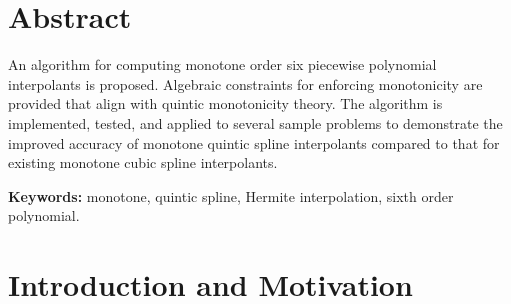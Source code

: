 \documentclass{scspaperproc}
\theoremstyle{scsthe}
\begin{document}
\maketitle



\section*{Abstract}

An algorithm for computing monotone order six piecewise polynomial
interpolants is proposed. Algebraic constraints for enforcing
monotonicity are provided that align with quintic monotonicity
theory. The algorithm is implemented, tested, and applied to several
sample problems to demonstrate the improved accuracy of monotone
quintic spline interpolants compared to that for existing monotone cubic spline
interpolants.

\textbf{Keywords:} monotone, quintic spline, Hermite interpolation, sixth order polynomial.


\section{Introduction and Motivation}
\label{sec:introduction}


\end{document}
